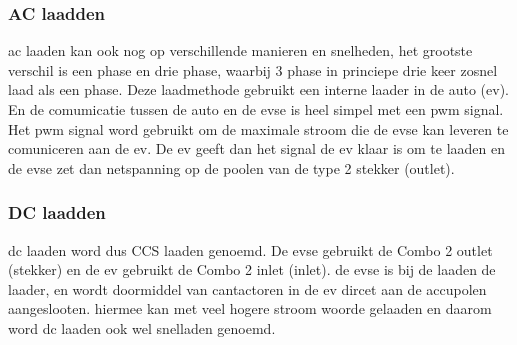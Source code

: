 \subsubsection{AC laadden}

\ac{ac} laaden kan ook nog op verschillende manieren en snelheden, het grootste
verschil is een phase en drie phase, waarbij 3 phase in princiepe drie keer
zosnel laad als een phase. Deze laadmethode gebruikt een interne laader in de
auto (\ac{ev}). En de comumicatie tussen de auto en de \ac{evse} is heel simpel
met een \ac{pwm} signal. Het \ac{pwm} signal word gebruikt om de maximale
stroom die de \ac{evse} kan leveren te comuniceren aan de \ac{ev}. De \ac{ev}
geeft dan het signal de \ac{ev} klaar is om te laaden en de \ac{evse} zet dan
netspanning op de poolen van de type 2 stekker (outlet).

\subsubsection{DC laadden}

\ac{dc} laaden word dus CCS laaden genoemd. De \ac{evse} gebruikt de Combo 2
outlet (stekker) en de \ac{ev} gebruikt de Combo 2 inlet (inlet). de \ac{evse}
is bij de laaden de laader, en wordt doormiddel van cantactoren in de \ac{ev}
dircet aan de accupolen aangeslooten. hiermee kan met veel hogere stroom woorde
gelaaden en daarom word \ac{dc} laaden ook wel snelladen genoemd.